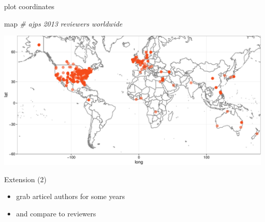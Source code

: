 \documentclass[ignorenonframetext,]{beamer}
\newenvironment{Shaded}{\begin{snugshade}}{\end{snugshade}}
\newcommand{\CommentTok}[1]{\textcolor[rgb]{0.56,0.35,0.01}{\textit{{#1}}}}
\newcommand{\NormalTok}[1]{{#1}}
\providecommand{\tightlist}{%
  \setlength{\itemsep}{0pt}\setlength{\parskip}{0pt}}
\begin{document}
\begin{frame}[fragile]{plot coordinates}

\begin{Shaded}
\begin{Highlighting}[]
\NormalTok{map }\CommentTok{# ajps 2013 reviewers worldwide}
\end{Highlighting}
\end{Shaded}

\includegraphics{regex_case_files/figure-beamer/unnamed-chunk-21-1.pdf}

\end{frame}

\begin{frame}{Extension (2)}

\begin{itemize}
\tightlist
\item
  grab articel authors for some years
\item
  and compare to reviewers
\end{itemize}

\end{frame}
\end{document}
